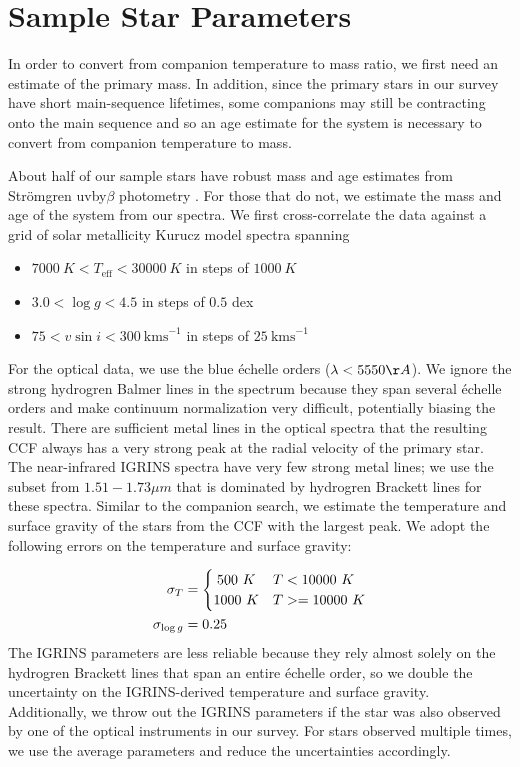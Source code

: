 \section{Sample Star Parameters}
\label{paper6_sec:sp}

In order to convert from companion temperature to mass ratio, we first need an estimate of the primary mass. In addition, since the primary stars in our survey have short main-sequence lifetimes, some companions may still be contracting onto the main sequence and so an age estimate for the system is necessary to convert from companion temperature to mass.

About half of our sample stars have robust mass and age estimates from Str\"omgren uvby$\beta$ photometry \citep{David2015}. For those that do not, we estimate the mass and age of the system from our spectra. We first cross-correlate the data against a grid of solar metallicity Kurucz model spectra \citep{Castelli2003} spanning

\begin{itemize}
\item $7000\ K < T_\mathrm{eff} < 30000\ K$ in steps of $1000\ K$
\item $3.0 < \log{g} < 4.5$ in steps of $0.5$ dex
\item $75 < v\sin{i} < 300\ \mathrm{km s}^{-1}$ in steps of $25\ \mathrm{km s}^{-1}$
\end{itemize}


For the optical data, we use the blue \'echelle orders ($\lambda < 5550 \AA$). We ignore the strong hydrogren Balmer lines in the spectrum because they span several \'echelle orders and make continuum normalization very difficult, potentially biasing the result. There are sufficient metal lines in the optical spectra that the resulting CCF always has a very strong peak at the radial velocity of the primary star. The near-infrared IGRINS spectra have very few strong metal lines; we use the subset from $1.51 - 1.73 \mu m$ that is dominated by hydrogren Brackett lines for these spectra. Similar to the companion search, we estimate the temperature and surface gravity of the stars from the CCF with the largest peak. We adopt the following errors on the temperature and surface gravity:

\begin{align}
 \sigma_T &= \begin{cases}
      \hfill 500\ K \hfill & T < 10000\ K \\
      \hfill 1000\ K \hfill & T >= 10000\ K \\
     \end{cases} \\
 \sigma_{\log{g}} &= 0.25
\end{align}
The IGRINS parameters are less reliable because they rely almost solely on the hydrogren Brackett lines that span an entire \'echelle order, so we double the uncertainty on the IGRINS-derived temperature and surface gravity. Additionally, we throw out the IGRINS parameters if the star was also observed by one of the optical instruments in our survey. For stars observed multiple times, we use the average parameters and reduce the uncertainties accordingly.

